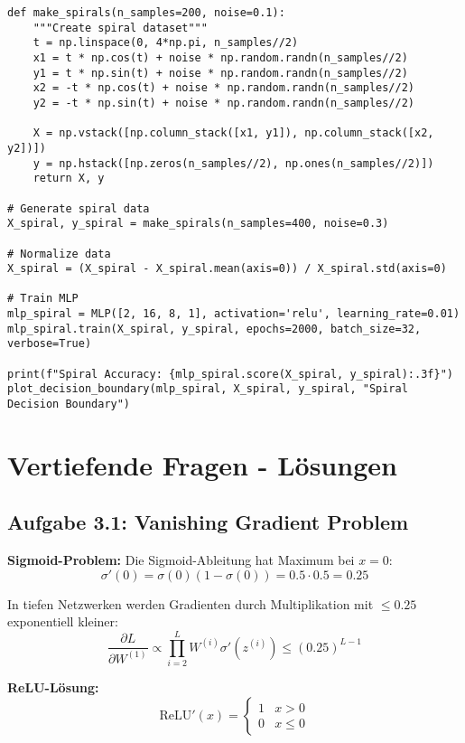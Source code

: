 ﻿\documentclass[12pt,a4paper]{article}
\begin{document}
\begin{lstlisting}
def make_spirals(n_samples=200, noise=0.1):
    """Create spiral dataset"""
    t = np.linspace(0, 4*np.pi, n_samples//2)
    x1 = t * np.cos(t) + noise * np.random.randn(n_samples//2)
    y1 = t * np.sin(t) + noise * np.random.randn(n_samples//2)
    x2 = -t * np.cos(t) + noise * np.random.randn(n_samples//2)
    y2 = -t * np.sin(t) + noise * np.random.randn(n_samples//2)
    
    X = np.vstack([np.column_stack([x1, y1]), np.column_stack([x2, y2])])
    y = np.hstack([np.zeros(n_samples//2), np.ones(n_samples//2)])
    return X, y

# Generate spiral data
X_spiral, y_spiral = make_spirals(n_samples=400, noise=0.3)

# Normalize data
X_spiral = (X_spiral - X_spiral.mean(axis=0)) / X_spiral.std(axis=0)

# Train MLP
mlp_spiral = MLP([2, 16, 8, 1], activation='relu', learning_rate=0.01)
mlp_spiral.train(X_spiral, y_spiral, epochs=2000, batch_size=32, verbose=True)

print(f"Spiral Accuracy: {mlp_spiral.score(X_spiral, y_spiral):.3f}")
plot_decision_boundary(mlp_spiral, X_spiral, y_spiral, "Spiral Decision Boundary")
\end{lstlisting}

\section{Vertiefende Fragen - Lösungen}

\subsection{Aufgabe 3.1: Vanishing Gradient Problem}

\textbf{Sigmoid-Problem:} Die Sigmoid-Ableitung hat Maximum bei $x=0$:
\begin{equation}
\sigma'(0) = \sigma(0)(1-\sigma(0)) = 0.5 \cdot 0.5 = 0.25
\end{equation}

In tiefen Netzwerken werden Gradienten durch Multiplikation mit $\leq 0.25$ exponentiell kleiner:
\begin{equation}
\frac{\partial L}{\partial W^{(1)}} \propto \prod_{i=2}^{L} W^{(i)} \sigma'(z^{(i)}) \leq (0.25)^{L-1}
\end{equation}

\textbf{ReLU-Lösung:} 
\begin{equation}
\text{ReLU}'(x) = \begin{cases} 1 & x > 0 \\ 0 & x \leq 0 \end{cases}
\end{equation}
\end{document}
